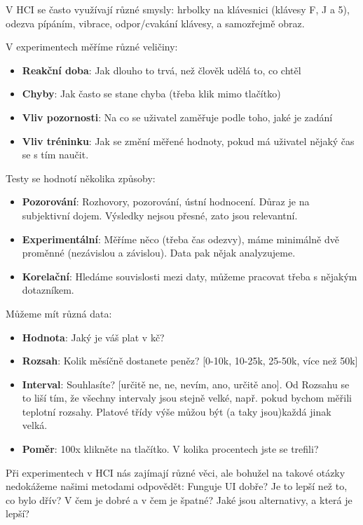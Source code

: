 \documentclass[10pt,a4paper]{article}
\begin{document}
V HCI se často využívají různé smysly: hrbolky na klávesnici (klávesy F, J a 5), odezva pípáním, vibrace, odpor/cvakání klávesy, a samozřejmě obraz.

\noindent V experimentech měříme různé veličiny:
\begin{itemize}
\item \textbf{Reakční doba}: Jak dlouho to trvá, než člověk udělá to, co chtěl
\item \textbf{Chyby}: Jak často se stane chyba (třeba klik mimo tlačítko)
\item \textbf{Vliv pozornosti}: Na co se uživatel zaměřuje podle toho, jaké je zadání
\item \textbf{Vliv tréninku}: Jak se změní měřené hodnoty, pokud má uživatel nějaký čas se s tím naučit.
\end{itemize}

\noindent Testy se hodnotí několika způsoby:

\begin{itemize}
\item \textbf{Pozorování}: Rozhovory, pozorování, ústní hodnocení. Důraz je na subjektivní dojem. Výsledky nejsou přesné, zato jsou relevantní.
\item \textbf{Experimentální}: Měříme něco (třeba čas odezvy), máme minimálně dvě proměnné (nezávislou a závislou). Data pak nějak analyzujeme.
\item \textbf{Korelační}: Hledáme souvislosti mezi daty, můžeme pracovat třeba s nějakým dotazníkem.
\end{itemize}

\noindent Můžeme mít různá data:

\begin{itemize}
\item \textbf{Hodnota}: Jaký je váš plat v kč?
\item \textbf{Rozsah}: Kolik měsíčně dostanete peněz? [0-10k, 10-25k, 25-50k, více než 50k]
\item \textbf{Interval}: Souhlasíte? [určitě ne, ne, nevím, ano, určitě ano]. Od Rozsahu se to liší tím, že všechny intervaly jsou stejně velké, např. pokud bychom měřili teplotní rozsahy. Platové třídy výše můžou být (a taky jsou)každá jinak velká.
\item \textbf{Poměr}: 100x klikněte na tlačítko. V kolika procentech jste se trefili?
\end{itemize}

Při experimentech v HCI nás zajímají různé věci, ale bohužel na takové otázky nedokážeme našimi metodami odpovědět: Funguje UI dobře? Je to lepší než to, co bylo dřív? V čem je dobré a v čem je špatné? Jaké jsou alternativy, a která je lepší?
\end{document}
